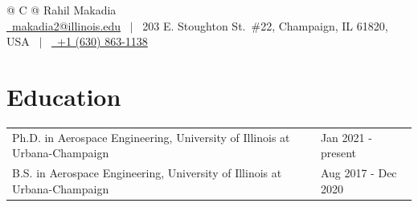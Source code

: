 \documentclass[letterpaper,12pt]{article}
\newif\ifdigital
\begin{document}
\pagestyle{empty} 


\begin{tabularx}{\linewidth}{@{} C @{}}
\Huge{Rahil Makadia} \\[7.5pt]
\ifdigital
\href{mailto:makadia2@illinois.edu}{\raisebox{-0.05\height}\faEnvelope \ makadia2@illinois.edu} \ $|$ \ 
\href{https://linkedin.com/in/rahil-makadia}{\raisebox{-0.05\height}\faLinkedin\ LinkedIn} \ $|$ \ 
\href{https://rahil-makadia.github.io}{\raisebox{-0.05\height}\faGlobe \ Website} \ $|$ \ 
\href{https://github.com/rahil-makadia}{\raisebox{-0.05\height}\faGithub\ GitHub} \ $|$ \ 
\href{tel:+16308631138}{\raisebox{-0.05\height}\faMobile \ +1 (630) 863-1138} \\
\else
\href{mailto:makadia2@illinois.edu}{\raisebox{-0.05\height}\faEnvelope \ makadia2@illinois.edu} \ $|$ \ 
203 E. Stoughton St.~\#22, Champaign, IL 61820, USA \ $|$ \
\href{tel:+16308631138}{\raisebox{-0.05\height}\faMobile \ +1 (630) 863-1138} \\
\fi
\end{tabularx}

\section{Education}
\begin{tabularx}{\linewidth}{@{}l X@{}}
Ph.D. in Aerospace Engineering, University of Illinois at Urbana-Champaign & \hfill Jan 2021 - present \\
B.S. in Aerospace Engineering, University of Illinois at Urbana-Champaign & \hfill Aug 2017 - Dec 2020 \\
\end{tabularx}


\end{document}
